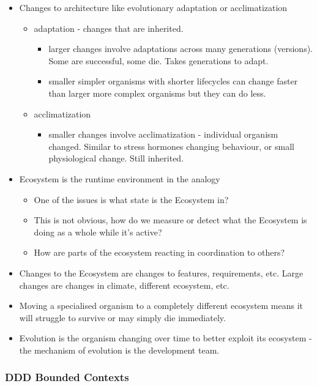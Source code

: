 \documentclass[11pt]{article}
\begin{document}
\begin{itemize}
\item Changes to architecture like evolutionary adaptation or acclimatization
\begin{itemize}
\item adaptation - changes that are inherited.
\begin{itemize}
\item larger changes involve adaptations across many generations (versions). Some are successful, some die. Takes generations to adapt.
\item smaller simpler organisms with shorter lifecycles can change faster than larger more complex organisms but they can do less.
\end{itemize}
\item acclimatization
\begin{itemize}
\item smaller changes involve acclimatization - individual organism changed. Similar to stress hormones changing behaviour, or small physiological change. Still inherited.
\end{itemize}
\end{itemize}
\item Ecosystem is the runtime environment in the analogy
\begin{itemize}
\item One of the issues is what state is the Ecosystem in?
\item This is not obvious, how do we measure or detect what the Ecosystem is doing as a whole while it's active?
\item How are parts of the ecosystem reacting in coordination to others?
\end{itemize}
\item Changes to the Ecosystem are changes to features, requirements, etc. Large changes are changes in climate, different ecosystem, etc.
\item Moving a specialised organism to a completely different ecosystem means it will struggle to survive or may simply die immediately.
\item Evolution is the organism changing over time to better exploit its ecosystem - the mechanism of evolution is the development team.
\end{itemize}

\subsubsection{DDD Bounded Contexts}
\label{sec:org3a4a02b}
\end{document}
